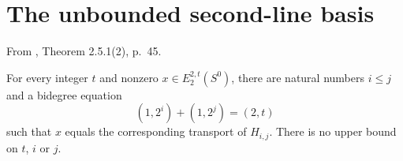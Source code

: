 \section{The unbounded second-line basis}
\begin{theorem}
\label{sem:E2Computation:two-line-exhaustive}
From \cite{Adams60}, Theorem 2.5.1(2), p.~45.\par

For every integer $t$ and nonzero $x\in E_2^{2,t}(S^0)$, there are natural numbers $i\leq j$ and a bidegree equation
\[
 (1,2^i)+(1,2^j)=(2,t)
\]
such that $x$ equals the corresponding transport of $H_{i,j}$. There is no upper bound on $t$, $i$ or $j$.
\end{theorem}
